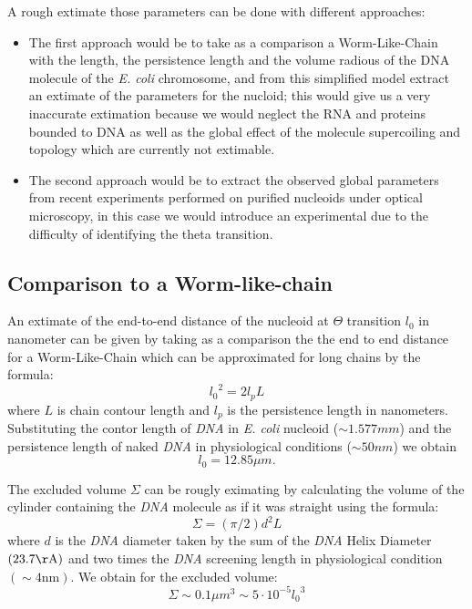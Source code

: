 \documentclass[12pt,a4paper,notitlepage]{article}
\newcommand{\ecoli}{\emph{E. coli}\xspace}
\newcommand{\nm}{\mathrm{nm}}
\newcommand{\dna}{\emph{DNA}\xspace}
\begin{document}
A rough extimate those parameters can be done with different
approaches:
\begin{itemize}
\item
The first approach would be to take as a comparison a Worm-Like-Chain
with the length, the persistence length and the volume radious of the
DNA molecule of the \ecoli chromosome, and from this simplified model
extract an extimate of the parameters for the nucloid; this would give
us a very inaccurate extimation because we would neglect the RNA and
proteins bounded to DNA as well as the global effect of the molecule
supercoiling and topology which are currently not extimable.
\item
The second approach would be to extract the observed global parameters
from recent experiments performed on purified nucleoids under optical
microscopy, in this case we would introduce an experimental
due to the difficulty of identifying the theta transition.
\end{itemize}

\subsection{Comparison to a Worm-like-chain}
An extimate of the end-to-end distance of the nucleoid at $\Theta$
transition $l_0$ in nanometer can be given by taking as a comparison
the the end to end distance for a Worm-Like-Chain which can be
approximated for long chains by the formula:
\begin{equation}
{l_0}^2 = 2 l_p L
\end{equation}
where $L$ is chain contour length and $l_p$ is the persistence
length in nanometers. Substituting the contor length of \dna in \ecoli
nucleoid  ($\sim 1.577 mm$) and the persistence length of naked \dna
in physiological conditions ($\sim 50 nm$) we obtain
\begin{equation}
  l_0 = 12.85 \mu m.
\end{equation}

The excluded volume $\Sigma$ can be rougly eximating by calculating
the volume of the cylinder containing the \dna molecule as if it was
straight using the formula:
\begin{equation}
\Sigma = (\pi / 2) d^2 L
\label{eq:sigmaS}
\end{equation}
where $d$ is the \dna diameter taken by the sum of the \dna Helix
Diameter $(23.7 \mathrm{\AA})$ and two times the \dna screening length
in physiological condition $(\sim 4\nm)$. We obtain for the excluded
volume:
\begin{equation}
  \Sigma \sim 0.1 \mu m^3 \sim 5 \cdot 10^{-5} {l_0}^3
\end{equation}
\end{document}
